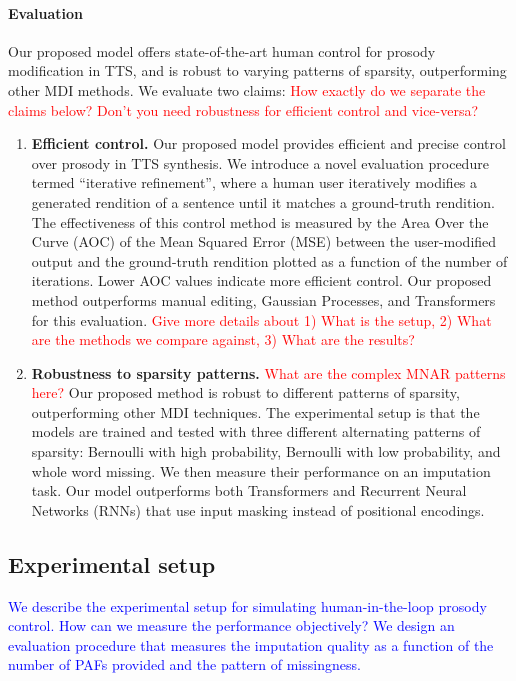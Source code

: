 \documentclass[a4paper,12pt,twoside,openright]{article}
\newcommand{\crit}[1]{\textcolor{red}{#1}}
\newcommand{\draft}[1]{\textcolor{blue}{#1}}
\begin{document}
\paragraph{Evaluation} Our proposed model offers state-of-the-art human control for prosody modification in TTS, and is robust to varying patterns of sparsity, outperforming other MDI methods. We evaluate two claims: \crit{How exactly do we separate the claims below? Don't you need robustness for efficient control and vice-versa?}

\begin{enumerate}
    \item \textbf{Efficient control.} Our proposed model provides efficient and precise control over prosody in TTS synthesis. We introduce a novel evaluation procedure termed ``iterative refinement'', where a human user iteratively modifies a generated rendition of a sentence until it matches a ground-truth rendition. The effectiveness of this control method is measured by the Area Over the Curve (AOC) of the Mean Squared Error (MSE) between the user-modified output and the ground-truth rendition plotted as a function of the number of iterations. Lower AOC values indicate more efficient control. Our proposed method outperforms manual editing, Gaussian Processes, and Transformers for this evaluation. \crit{Give more details about 1) What is the setup, 2) What are the methods we compare against, 3) What are the results?}
    \item \textbf{Robustness to sparsity patterns.} \crit{What are the complex MNAR patterns here?} Our proposed method is robust to different patterns of sparsity, outperforming other MDI techniques. The experimental setup is that the models are trained and tested with three different alternating patterns of sparsity: Bernoulli with high probability, Bernoulli with low probability, and whole word missing. We then measure their performance on an imputation task. Our model outperforms both Transformers and Recurrent Neural Networks (RNNs) that use input masking instead of positional encodings.
\end{enumerate}

\subsection{Experimental setup}

\draft{We describe the experimental setup for simulating human-in-the-loop prosody control. How can we measure the performance objectively? We design an evaluation procedure that measures the imputation quality as a function of the number of PAFs provided and the pattern of missingness.}
\end{document}
